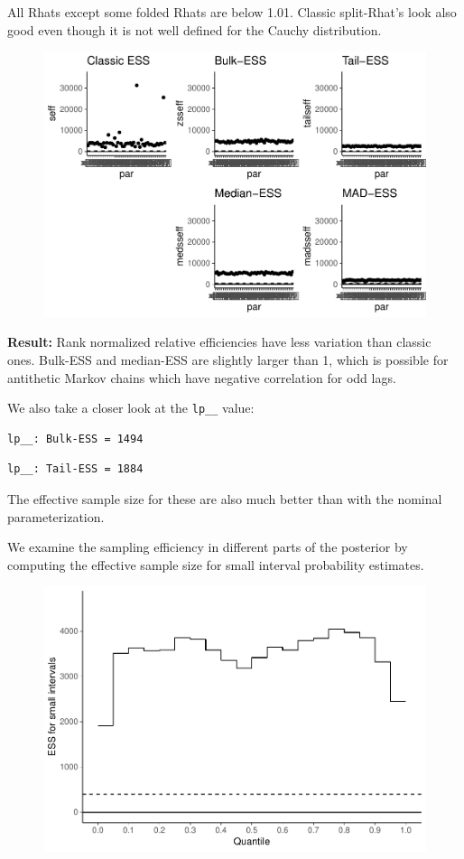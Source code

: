 \documentclass[american,]{article}
\begin{document}
All Rhats except some folded Rhats are below 1.01. Classic split-Rhat's
look also good even though it is not well defined for the Cauchy
distribution.

\begin{figure}[tp]
  \centering
  \includegraphics[width=0.6\linewidth]{graphics/ess-fit-alt3-1.pdf}
\end{figure}

\textbf{Result:} Rank normalized relative efficiencies have less
variation than classic ones. Bulk-ESS and median-ESS are slightly larger
than 1, which is possible for antithetic Markov chains which have
negative correlation for odd lags.

We also take a closer look at the \texttt{lp\_\_} value:

\begin{verbatim}
lp__: Bulk-ESS = 1494
\end{verbatim}

\begin{verbatim}
lp__: Tail-ESS = 1884
\end{verbatim}

The effective sample size for these are also much better than with the
nominal parameterization.

We examine the sampling efficiency in different parts of the posterior
by computing the effective sample size for small interval probability
estimates.

\begin{figure}[tp]
  \centering
  \includegraphics[width=0.6\linewidth]{graphics/local-ess-fit-alt3-1.pdf}
\end{figure}
\end{document}
